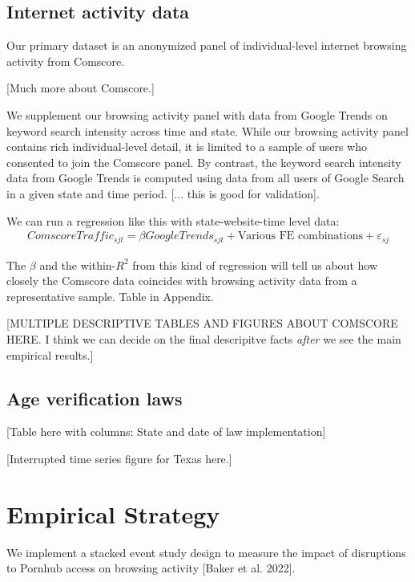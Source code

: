 \subsection{Internet activity data}

Our primary dataset is an anonymized panel of individual-level internet browsing activity from Comscore.

[Much more about Comscore.]

We supplement our browsing activity panel with data from Google Trends on keyword search intensity across time and state. While our browsing activity panel contains rich individual-level detail, it is limited to a sample of users who consented to join the Comscore panel. By contrast, the keyword search intensity data from Google Trends is computed using data from all users of Google Search in a given state and time period. [... this is good for validation].

We can run a regression like this with state-website-time level data:
\begin{gather}
    ComscoreTraffic_{sjt} = \beta GoogleTrends_{sjt} + \text{Various FE combinations} + \varepsilon_{sj}
\end{gather}

The $\beta$ and the within-$R^2$ from this kind of regression will tell us about how closely the Comscore data coincides with browsing activity data from a representative sample. Table in Appendix.

[MULTIPLE DESCRIPTIVE TABLES AND FIGURES ABOUT COMSCORE HERE. I think we can decide on the final descripitve facts \emph{after} we see the main empirical results.]

\subsection{Age verification laws}

[Table here with columns: State and date of law implementation]

[Interrupted time series figure for Texas here.]

\section{Empirical Strategy}

We implement a stacked event study design to measure the impact of disruptions to Pornhub access on browsing activity [Baker et al. 2022]. 


